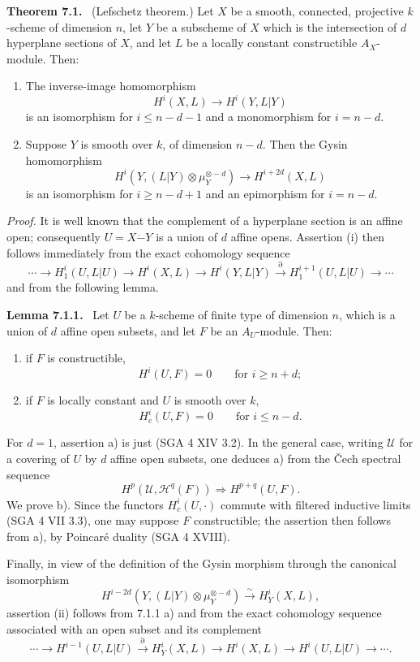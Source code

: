 \documentclass[11pt]{article}
\newenvironment{statement}[1]{\par\medskip\noindent\textbf{#1.}\ }{\par\medskip}
\begin{document}
\begin{statement}{Theorem 7.1}
(Lefschetz theorem.) Let $X$ be a smooth, connected, projective $k$-scheme of dimension $n$, let $Y$ be a subscheme of $X$ which is the intersection of $d$ hyperplane sections of $X$, and let $L$ be a locally constant constructible $A_X$-module. Then:
\begin{enumerate}[label=(\roman*)]
\item The inverse-image homomorphism
\[
H^i(X,L)\to H^i(Y,L|Y)
\]
is an isomorphism for $i\le n-d-1$ and a monomorphism for $i=n-d$.
\item Suppose $Y$ is smooth over $k$, of dimension $n-d$. Then the Gysin homomorphism
\[
H^i(Y,(L|Y)\otimes\mu_Y^{\otimes -d})\to H^{i+2d}(X,L)
\]
is an isomorphism for $i\ge n-d+1$ and an epimorphism for $i=n-d$.
\end{enumerate}
\end{statement}

\emph{Proof.} It is well known that the complement of a hyperplane section is an affine open; consequently $U=X\mathbin{\dot{-}}Y$ is a union of $d$ affine opens. Assertion (i) then follows immediately from the exact cohomology sequence
\[
\cdots\to H_1^i(U,L|U)\to H^i(X,L)\to H^i(Y,L|Y)
\xrightarrow{\partial} H_1^{i+1}(U,L|U)\to\cdots
\]
and from the following lemma.

\begin{statement}{Lemma 7.1.1}
Let $U$ be a $k$-scheme of finite type of dimension $n$, which is a union of $d$ affine open subsets, and let $F$ be an $A_U$-module. Then:
\begin{enumerate}[label=\alph*)]
\item if $F$ is constructible,
\[
H^i(U,F)=0\qquad\text{for }i\ge n+d;
\]
\item if $F$ is locally constant and $U$ is smooth over $k$,
\[
H^i_c(U,F)=0\qquad\text{for }i\le n-d.
\]
\end{enumerate}
\end{statement}

For $d=1$, assertion a) is just (SGA 4 XIV 3.2). In the general case, writing $\mathcal U$ for a covering of $U$ by $d$ affine open subsets, one deduces a) from the Čech spectral sequence
\[
H^p(\mathcal U,\mathcal H^q(F))\Rightarrow H^{p+q}(U,F).
\]
We prove b). Since the functors $H_c^i(U,\cdot)$ commute with filtered inductive limits (SGA 4 VII 3.3), one may suppose $F$ constructible; the assertion then follows from a), by Poincaré duality (SGA 4 XVIII).

Finally, in view of the definition of the Gysin morphism through the canonical isomorphism
\[
H^{i-2d}(Y,(L|Y)\otimes\mu_Y^{\otimes -d})\xrightarrow{\sim} H^i_Y(X,L),
\tag{7.1.2}
\]
assertion (ii) follows from 7.1.1 a) and from the exact cohomology sequence associated with an open subset and its complement
\[
\cdots\to H^{i-1}(U,L|U)\xrightarrow{\partial}H^i_Y(X,L)\to H^i(X,L)\to H^i(U,L|U)\to\cdots .
\]
\end{document}

